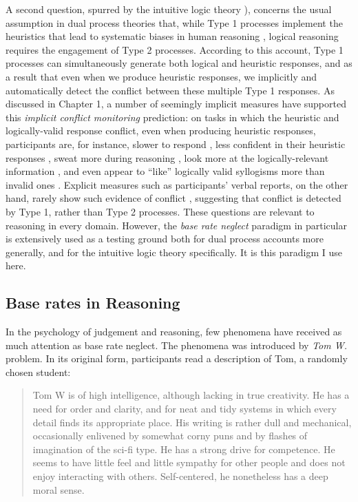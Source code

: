 A second question, spurred by the intuitive logic theory
\citep{DeNeys2012,DeNeys2014a}),
concerns the usual assumption in dual process theories that,
while Type 1 processes implement the heuristics that
lead to systematic biases in human reasoning \citep{Kahneman2005,Kahneman2011},
logical reasoning requires the engagement of Type 2 processes.
According to this account, Type 1 processes can
simultaneously generate both logical and heuristic responses,
and as a result that even when we produce heuristic responses,
we implicitly and automatically detect the conflict
between these multiple Type 1 responses.
As discussed in Chapter 1, a number of seemingly implicit measures
have supported this \emph{implicit conflict monitoring} prediction:
on tasks in which the heuristic and logically-valid response conflict,
even when producing heuristic responses, participants are, for instance,
slower to respond \citep{DeNeys2008},
less confident in their heuristic responses \citep{DeNeys2013a},
sweat more during reasoning \citep{DeNeys2010},
look more at the logically-relevant information \citep{DeNeys2008},
and even appear to ``like'' logically valid syllogisms more than invalid ones
\citep{Morsanyi2012}.
Explicit measures such as participants' verbal reports,
on the other hand, rarely show such evidence of conflict \citep{DeNeys2008},
suggesting that conflict is detected by Type 1,
rather than Type 2 processes.
These questions are relevant to reasoning in every domain.
However, the \emph{base rate neglect} paradigm in particular
is extensively used as a testing ground
both for dual process accounts more generally,
and for the intuitive logic theory specifically.
It is this paradigm I use here.


\subsection{Base rates in Reasoning}

In the psychology of judgement and reasoning,
few phenomena have received as much attention as base rate neglect.
The phenomena was introduced by  \emph{Tom W.} problem.
In its original form, participants read a description of Tom,
a randomly chosen student:

\begin{quote}
  Tom W is of high intelligence, although lacking in true creativity. He
  has a need for order and clarity, and for neat and tidy systems in
  which every detail finds its appropriate place. His writing is rather
  dull and mechanical, occasionally enlivened by somewhat corny puns and
  by flashes of imagination of the sci-fi type. He has a strong drive
  for competence.  He seems to have little feel and little sympathy for
  other people and does not enjoy interacting with others.
  Self-centered, he nonetheless has a deep moral sense.
\end{quote}

